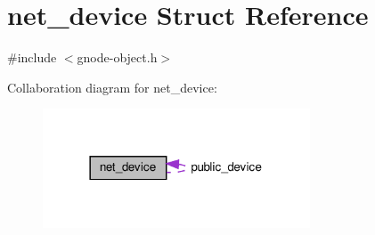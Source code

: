 \hypertarget{structnet__device}{}\section{net\+\_\+device Struct Reference}
\label{structnet__device}


{\ttfamily \#include $<$gnode-\/object.\+h$>$}



Collaboration diagram for net\+\_\+device\+:\nopagebreak
\begin{figure}[H]
\begin{center}
\leavevmode
\includegraphics[width=225pt]{structnet__device__coll__graph}
\end{center}
\end{figure}
